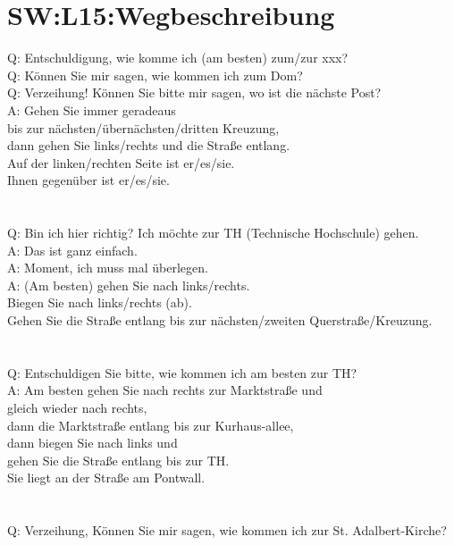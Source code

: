 \section{SW:L15:Wegbeschreibung}
\noindent
Q: Entschuldigung, wie komme ich (am besten) zum/zur xxx? \\
Q: Können Sie mir sagen, wie kommen ich zum Dom? \\
Q: Verzeihung! Können Sie bitte mir sagen, wo ist die nächste Post? \\
A: Gehen Sie immer geradeaus \\
bis zur nächsten/übernächsten/dritten Kreuzung,  \\
dann gehen Sie links/rechts und die Straße entlang. \\
Auf der linken/rechten Seite ist er/es/sie. \\
Ihnen gegenüber ist er/es/sie. \\
\\
\\
\noindent
Q: Bin ich hier richtig? Ich möchte zur TH (Technische Hochschule) gehen.  \\
A: Das ist ganz einfach.  \\
A: Moment, ich muss mal überlegen. \\
A: (Am besten) gehen Sie nach links/rechts. \\
Biegen Sie nach links/rechts (ab). \\
Gehen Sie die Straße entlang bis zur nächsten/zweiten Querstraße/Kreuzung. \\
\\
\\
\noindent
Q: Entschuldigen Sie bitte, wie kommen ich am besten zur TH? \\
A: Am besten gehen Sie nach rechts zur Marktstraße und \\
gleich wieder nach rechts, \\
dann die Marktstraße entlang bis zur Kurhaus-allee, \\
dann biegen Sie nach links und \\
gehen Sie die Straße entlang bis zur TH. \\
Sie liegt an der Straße am Pontwall. \\
\\
\\
\noindent
Q: Verzeihung, Können Sie mir sagen, wie kommen ich zur St. Adalbert-Kirche? \\
